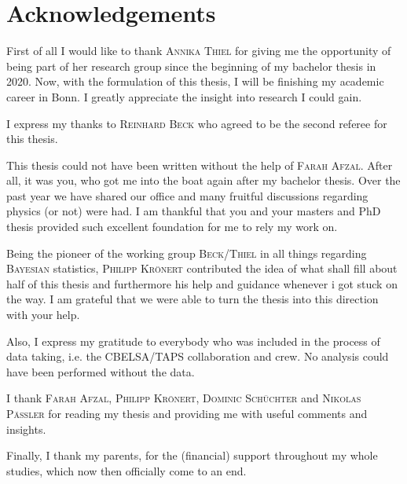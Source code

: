 \chapter*{Acknowledgements}
\label{sec:ack}

\noindent First of all I would like to thank \textsc{Annika Thiel} for giving me the opportunity of being part of her research group since the beginning of my bachelor thesis in 2020. Now, with the formulation of this thesis, I will be finishing my academic career in Bonn. I greatly appreciate the insight into research I could gain.
\vspace{1cm}

\noindent I express my thanks to \textsc{Reinhard Beck} who agreed to be the second referee for this thesis.
\vspace{1cm}

\noindent This thesis could not have been written without the help of \textsc{Farah Afzal}. After all, it was you, who got me into the boat again after my bachelor thesis. Over the past year we have shared our office and many fruitful discussions regarding physics (or not) were had. I am thankful that you and your masters and PhD thesis provided such excellent foundation for me to rely my work on.
\vspace{1cm}

\noindent Being the pioneer of the working group \textsc{Beck/Thiel} in all things regarding \textsc{Bayesian} statistics, \textsc{Philipp Krönert} contributed the idea of what shall fill about half of this thesis and furthermore his help and guidance whenever i got stuck on the way. I am grateful that we were able to turn the thesis into this direction with your help.
\vspace{1cm}

\noindent Also, I express my gratitude to everybody who was included in the process of data taking, i.e. the CBELSA/TAPS collaboration and crew. No analysis could have been performed without the data.
\vspace{1cm}

\noindent I thank \textsc{Farah Afzal, Philipp Krönert, Dominic Schüchter} and \textsc{Nikolas Pässler} for reading my thesis and providing me with useful comments and insights.
\vspace{1cm}

\noindent Finally, I thank my parents, for the (financial) support throughout my whole studies, which now then officially come to an end. 

   


